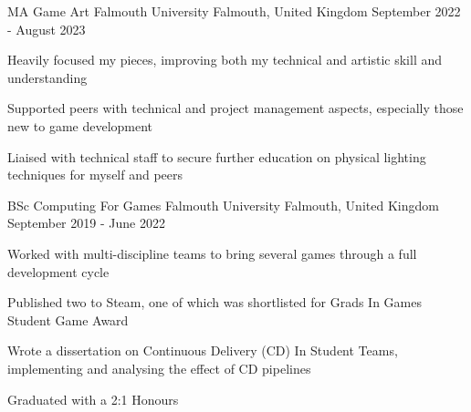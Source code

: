 \begin{cventries}
  \cventry
  {MA Game Art}
  {Falmouth University}
  {Falmouth, United Kingdom}
  {September 2022 - August 2023}
  {
    \begin{cvitems}
      \item Heavily focused my pieces, improving both my technical and artistic skill and understanding
      \item Supported peers with technical and project management aspects, especially those new to game development
      \item Liaised with technical staff to secure further education on physical lighting techniques for myself and peers
    \end{cvitems}
  }

  \cventry
    {BSc Computing For Games} %
    {Falmouth University} %
    {Falmouth, United Kingdom} %
    {September 2019 - June 2022} %
    {
      \begin{cvitems} %
        \item Worked with multi-discipline teams to bring several games through a full development cycle
        \item Published two to Steam, one of which was shortlisted for Grads In Games Student Game Award
        \item Wrote a dissertation on Continuous Delivery (CD) In Student Teams, implementing and analysing the effect of CD pipelines
        \item Graduated with a 2:1 Honours
      \end{cvitems}
    }
\end{cventries}